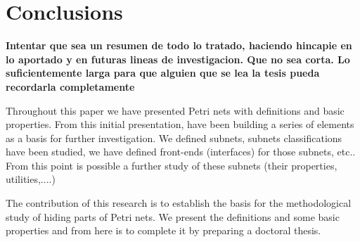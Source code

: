 
\chapter{Conclusions} %

\label{Chapter: Conclusions} %


\textbf{Intentar que sea un resumen de todo lo tratado, haciendo hincapie en lo aportado
y en futuras lineas de investigacion. Que no sea corta. Lo suficientemente
larga para que alguien que se lea la tesis pueda recordarla completamente}

Throughout this paper we have presented Petri nets with definitions and basic properties. From this initial presentation, have been building a series of elements as a basis for further investigation. We defined subnets, subnets classifications have been studied, we have defined front-ends (interfaces) for those subnets, etc.. From this point is possible a further study of these subnets (their properties, utilities,....)

The contribution of this research is to establish the basis for the methodological study of hiding parts of Petri nets. We present the definitions and some basic properties and from here is to complete it by preparing a doctoral thesis.
